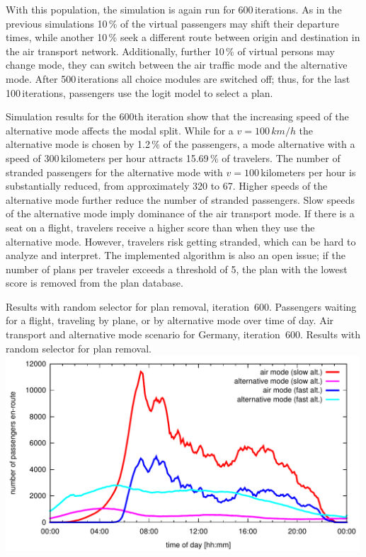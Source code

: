 With this population, the simulation is again run for 600\,iterations. 
As in the previous simulations 10\,\% of the virtual passengers may shift their departure times, while another 10\,\% seek a different route between origin and destination in the air transport network. 
Additionally, further 10\,\% of virtual persons may change mode, \ie they can switch between the air traffic mode and the alternative mode. 
After 500\,iterations all choice modules are switched off; thus, for the last 100\,iterations, passengers use the logit model to select a plan. 

Simulation results for the 600th iteration show that the increasing speed of the alternative mode affects the modal split.  
While for a $v = 100 \, km/h$ the alternative mode is chosen by 1.2\,\% of the passengers, a mode alternative with a speed of 300\,kilometers per hour attracts 15.69\,\% of travelers. 
The number of stranded passengers for the alternative mode with $v = 100$\,kilometers per hour is substantially reduced, from approximately 320 to 67. 
Higher speeds of the alternative mode further reduce the number of stranded passengers. 
Slow speeds of the alternative mode imply dominance of the air transport mode. 
If there is a seat on a flight, travelers receive a higher score than when they use the alternative mode. 
However, travelers risk getting stranded, which can be hard to analyze and interpret. 
The implemented algorithm is also an open issue; if the number of plans per traveler exceeds a threshold of 5, the plan with the lowest score is removed from the plan database. 

\createfigure%
{Results with random selector for plan removal, iteration~600.}%
{Passengers waiting for a flight, traveling by plane, or by alternative mode over time of day. 
Air transport and alternative mode scenario for Germany, iteration~600. Results with random selector for plan removal.}%
{\label{fig:2009_leg_histogram_modes_psl}}%
{\includegraphics[width=0.99\textwidth, angle=0]{./extending/figures/air/leg_histogram_improved_flight_train_en_route_1893_1897_it_600.pdf}}%
{\citet{Grether2014PhD}}

